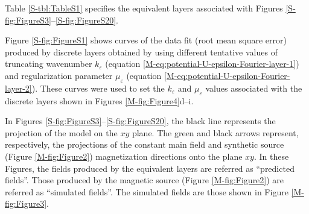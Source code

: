 \documentclass[draft,jgrga]{agutexSI2019}
\newcommand{\mainref}[1]{\ref{M-#1}}
\begin{document}
\begin{article}
Table \ref{S-tbl:TableS1} specifies the equivalent layers associated 
with Figures \ref{S-fig:FigureS3}--\ref{S-fig:FigureS20}.

Figure \ref{S-fig:FigureS1} shows curves of the data fit (root mean square error) produced by
discrete layers obtained by using different tentative values of truncating wavenumber
$k_{\varepsilon}$ (equation \mainref{eq:potential-U-epsilon-Fourier-layer-1}) and  
regularization parameter $\mu_{\varepsilon}$
(equation \mainref{eq:potential-U-epsilon-Fourier-layer-2}). 
These curves were used to set the $k_{\varepsilon}$ and $\mu_{\varepsilon}$ values associated
with the discrete layers shown in Figures \mainref{fig:Figure4}d--i.

In Figures \ref{S-fig:FigureS3}--\ref{S-fig:FigureS20}, the black line represents the 
projection of the model on the $xy$ plane. The green and black arrows represent, respectively, 
the projections of the constant main field and synthetic source (Figure \mainref{fig:Figure2}) 
magnetization directions onto the plane $xy$. In these Figures, the fields produced by the 
equivalent layers are referred as ``predicted fields''. Those produced by the magnetic source 
(Figure \mainref{fig:Figure2}) are referred as ``simulated fields''. The simulated fields are 
those shown in Figure \mainref{fig:Figure3}.


%




% 
%
%
%
%

%  





\end{article}
\end{document}
